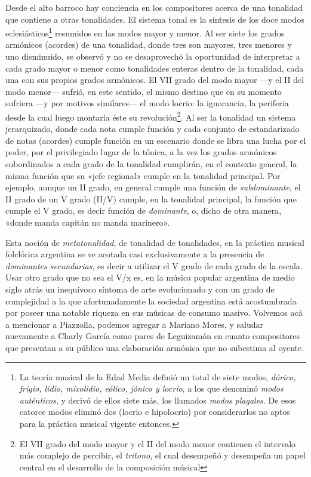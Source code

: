 Desde el alto barroco hay conciencia en los compositores acerca de una tonalidad que contiene a otras tonalidades. El sistema tonal es la síntesis de los doce modos eclesiásticos\footnote{La teoría musical de la Edad Media definió un total de siete modos, \emph{dórico, frigio, lidio, mixolidio, eólico, jónico y locrio}, a los que denominó \emph{modos auténticos}, y derivó de ellos siete más, los llamados \emph{modos plagales}. De esos catorce modos eliminó dos (locrio e hipolocrio) por considerarlos no aptos para la práctica musical vigente entonces.} resumidos en las modos mayor y menor. Al ser siete los grados armónicos (acordes) de una tonalidad, donde tres son mayores, tres menores y uno disminuido, se observó y no se desaprovechó la oportunidad de interpretar a cada grado mayor o menor como tonalidades enteras dentro de la tonalidad, cada una con sus propios grados armónicos. El VII grado del modo mayor ---y el II del modo menor--- sufrió, en este sentido, el mismo destino que en su momento sufriera ---y por motivos similares--- el modo locrio: la ignorancia, la periferia desde la cual luego montaría éste su revolución\footnote{El VII grado del modo mayor y el II del modo menor contienen el intervalo más complejo de percibir, el \emph{tritono}, el cual desempeñó y desempeña un papel central en el desarrollo de la composición músical}. Al ser la tonalidad un sistema jerarquizado, donde cada nota cumple función y cada conjunto de estandarizado de notas (acordes) cumple función en un escenario donde se libra una lucha por el poder, por el privilegiado lugar de la tónica, a la vez los grados armónicos subordinados a cada grado de la tonalidad cumplirán, en el contexto general, la misma función que su «jefe regional» cumple en la tonalidad principal. Por ejemplo, aunque un II grado, en general cumple una función de \emph{subdominante}, el II grado de un V grado (II/V) cumple, en la tonalidad principal, la función que cumple el V grado, es decir función de \emph{dominante}, o, dicho de otra manera, «donde manda capitán no manda marinero».

Esta noción de \emph{metatonalidad}, de tonalidad de tonalidades, en la práctica musical folclórica argentina se ve acotada casi exclusivamente a la presencia de \emph{dominantes secundarias}, es decir a utilizar el V grado de cada grado de la escala. Usar otro grado que no sea el V/x es, en la música popular argentina de medio siglo atrás un inequívoco síntoma de arte evolucionado y con un grado de complejidad a la que afortunadamente la sociedad argentina está acostumbrada por poseer una notable riqueza en sus músicas de consumo masivo. Volvemos acá a mencionar a Piazzolla, podemos agregar a Mariano Mores, y saludar nuevamente a Charly García como pares de Leguizamón en cuanto compositores que presentan a su público una elaboración armónica que no subestima al oyente.

